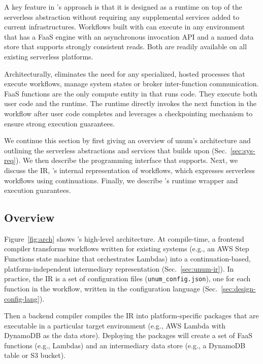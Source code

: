 A key feature in \name{}'s approach is that it is designed as a runtime on top
of the serverless abstraction without requiring any supplemental services
added to current infrastructures. Workflows built with \name{} can execute in
any environment that has a FaaS engine with an asynchronous invocation API and
a named data store that supports strongly consistent reads. Both are readily
available on all existing serverless platforms.

Architecturally, \name{} eliminates the need for any specialized, hosted
processes that execute workflows, manage system states or broker
inter-function communication. FaaS functions are the only compute entity in
\name{} that runs code. They execute both user code and the \name{} runtime. The
\name{} runtime directly invokes the next function in the workflow after user
code completes and leverages a checkpointing mechanism to ensure strong
execution guarantees.

We continue this section by first giving an overview of unum's architecture
and outlining the serverless abstractions and services that \name{} builds
upon (Sec.~\ref{sec:sys-req}). We then describe the programming interface that
\name{} supports. Next, we discuss the \name{} IR, \name{}'s internal
representation of workflows, which expresses serverless workflows using
continuations. Finally, we describe \name{}'s runtime wrapper and execution
guarantees.%

\subsection{Overview}

Figure~\ref{fig:arch} shows \name{}'s high-level architecture. At
compile-time, a frontend compiler transforms workflows written for existing
systems (e.g., an AWS Step Functions state machine that orchestrates Lambdas)
into a continuation-based, platform-independent intermediary representation
(Sec.~\ref{sec:unum-ir}). In practice, the IR is a set of configuration files
(\texttt{unum\_config.json}), one for each function in the workflow, written
in the \name{} configuration language (Sec.~\ref{sec:design-config-lang}).

Then a backend compiler compiles the IR into platform-specific packages that
are executable in a particular target environment (e.g., AWS Lambda with
DynamoDB as the data store). Deploying the packages will create a set of FaaS
functions (e.g., Lambdas) and an intermediary data store (e.g., a DynamoDB
table or S3 bucket).

